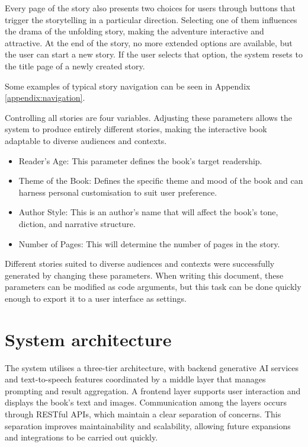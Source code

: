 \documentclass[conference]{IEEEtran}
\begin{document}
	Every page of the story also presents two choices for users through buttons that trigger the storytelling in a particular direction. Selecting one of them influences the drama of the unfolding story, making the adventure interactive and attractive. At the end of the story, no more extended options are available, but the user can start a new story. If the user selects that option, the system resets to the title page of a newly created story.
	
	Some examples of typical story navigation can be seen in Appendix \ref{appendix:navigation}.
	
	Controlling all stories are four variables. Adjusting these parameters allows the system to produce entirely different stories, making the interactive book adaptable to diverse audiences and contexts. 
	
	\begin{itemize}[]
		\item Reader's Age: This parameter defines the book's target readership.
		\item Theme of the Book: Defines the specific theme and mood of the book and can harness personal customisation to suit user preference.
		\item Author Style: This is an author's name that will affect the book's tone, diction, and narrative structure.
		\item Number of Pages: This will determine the number of pages in the story.
	\end{itemize}
	
	Different stories suited to diverse audiences and contexts were successfully generated by changing these parameters. When writing this document, these parameters can be modified as code arguments, but this task can be done quickly enough to export it to a user interface as settings.
	
	
	\section {System architecture}
	
	The system utilises a three-tier architecture, with backend generative AI services and text-to-speech features coordinated by a middle layer that manages prompting and result aggregation. A frontend layer supports user interaction and displays the book's text and images. Communication among the layers occurs through RESTful APIs, which maintain a clear separation of concerns. This separation improves maintainability and scalability, allowing future expansions and integrations to be carried out quickly.
	
\end{document}
